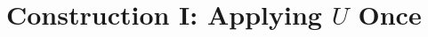 \documentclass[11pt,letterpaper]{article}
\newcommand{\<}{\langle}
\renewcommand{\>}{\rangle}
\begin{document}





\section{Construction I: Applying $U$ Once} \label{revisionNagajWocjan}
\end{document}
